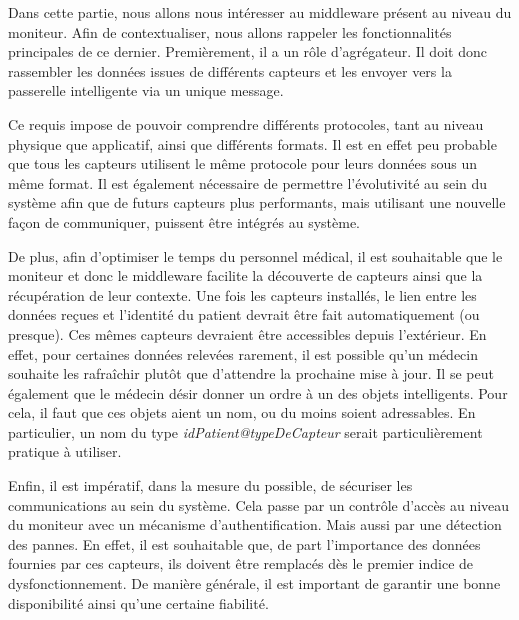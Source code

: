 Dans cette partie, nous allons nous intéresser au middleware présent au niveau du moniteur. Afin de contextualiser, nous allons
rappeler les fonctionnalités principales de ce dernier. Premièrement, il a un rôle d'agrégateur. Il doit donc rassembler les
données issues de différents capteurs et les envoyer vers la passerelle intelligente via un unique message. 
\newline

Ce requis impose de pouvoir comprendre différents protocoles, tant au niveau physique que applicatif, ainsi que différents
formats. Il est en effet peu probable que tous les capteurs utilisent le même protocole pour leurs données sous un même format. Il
est également nécessaire de permettre l'évolutivité au sein du système afin que de futurs capteurs plus performants, mais
utilisant une nouvelle façon de communiquer, puissent être intégrés au système.
\newline

De plus, afin d'optimiser le temps du personnel médical, il est souhaitable que le moniteur et donc le middleware facilite la
découverte de capteurs ainsi que la récupération de leur contexte. Une fois les capteurs installés, le lien entre les données
reçues et l'identité du patient devrait être fait automatiquement (ou presque). Ces mêmes capteurs devraient être accessibles
depuis l'extérieur. En effet, pour certaines données relevées rarement, il est possible qu'un médecin souhaite les rafraîchir
plutôt que d'attendre la prochaine mise à jour. Il se peut également que le médecin désir donner un ordre à un des objets
intelligents. Pour cela, il faut que ces objets aient un nom, ou du moins soient adressables. En particulier, un nom du type
\textit{idPatient@typeDeCapteur} serait particulièrement pratique à utiliser.
\newline

Enfin, il est impératif, dans la mesure du possible, de sécuriser les communications au sein du système. Cela passe par un
contrôle d'accès au niveau du moniteur avec un mécanisme d'authentification. Mais aussi par une détection des pannes. En effet, il
est souhaitable que, de part l'importance des données fournies par ces capteurs, ils doivent être remplacés dès le premier indice
de dysfonctionnement. De manière générale, il est important de garantir une bonne disponibilité ainsi qu'une certaine fiabilité.

